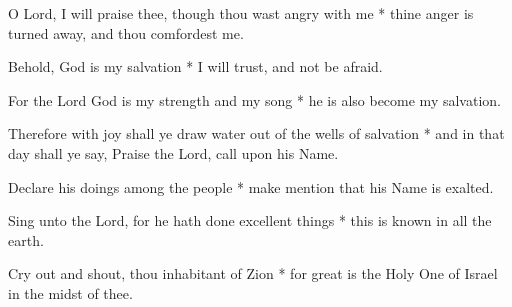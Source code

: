 O Lord, I will praise thee, though thou wast angry with me * thine anger is turned away, and thou comfordest me.

Behold, God is my salvation * I will trust, and not be afraid.

For the Lord God is my strength and my song * he is also become my salvation.

Therefore with joy shall ye draw water out of the wells of salvation * and in that day shall ye say, Praise the Lord, call upon his Name.

Declare his doings among the people * make mention that his Name is exalted.

Sing unto the Lord, for he hath done excellent things * this is known in all the earth.

Cry out and shout, thou inhabitant of Zion * for great is the Holy One of Israel in the midst of thee.